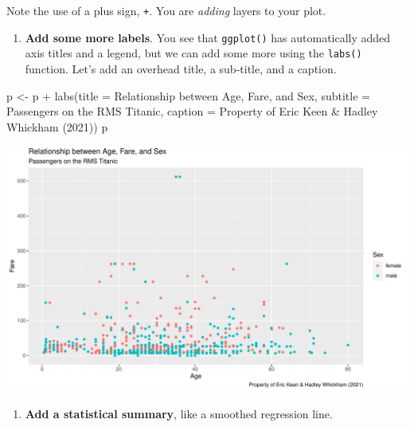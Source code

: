 \documentclass[
]{book}
\newenvironment{Shaded}{\begin{snugshade}}{\end{snugshade}}
\newcommand{\AttributeTok}[1]{\textcolor[rgb]{0.77,0.63,0.00}{#1}}
\newcommand{\FunctionTok}[1]{\textcolor[rgb]{0.00,0.00,0.00}{#1}}
\newcommand{\NormalTok}[1]{#1}
\newcommand{\OtherTok}[1]{\textcolor[rgb]{0.56,0.35,0.01}{#1}}
\newcommand{\SpecialCharTok}[1]{\textcolor[rgb]{0.00,0.00,0.00}{#1}}
\newcommand{\StringTok}[1]{\textcolor[rgb]{0.31,0.60,0.02}{#1}}
\providecommand{\tightlist}{%
  \setlength{\itemsep}{0pt}\setlength{\parskip}{0pt}}
\begin{document}
Note the use of a plus sign, \texttt{+}. You are \emph{adding} layers to your plot.

\begin{enumerate}
\def\labelenumi{(\arabic{enumi})}
\setcounter{enumi}{4}
\tightlist
\item
  \textbf{Add some more labels}. You see that \texttt{ggplot()} has automatically added axis titles and a legend, but we can add some more using the \texttt{labs()} function. Let's add an overhead title, a sub-title, and a caption.
\end{enumerate}

\begin{Shaded}
\begin{Highlighting}[]
\NormalTok{p }\OtherTok{\textless{}{-}}\NormalTok{ p }\SpecialCharTok{+} \FunctionTok{labs}\NormalTok{(}\AttributeTok{title =} \StringTok{\textquotesingle{}Relationship between Age, Fare, and Sex\textquotesingle{}}\NormalTok{,}
              \AttributeTok{subtitle =} \StringTok{\textquotesingle{}Passengers on the RMS Titanic\textquotesingle{}}\NormalTok{,}
              \AttributeTok{caption =} \StringTok{\textquotesingle{}Property of Eric Keen \& Hadley Whickham (2021)\textquotesingle{}}\NormalTok{)}
\NormalTok{p}
\end{Highlighting}
\end{Shaded}

\includegraphics{figures/unnamed-chunk-158-1.pdf}

\begin{enumerate}
\def\labelenumi{(\arabic{enumi})}
\setcounter{enumi}{5}
\tightlist
\item
  \textbf{Add a statistical summary}, like a smoothed regression line.
\end{enumerate}
\end{document}
